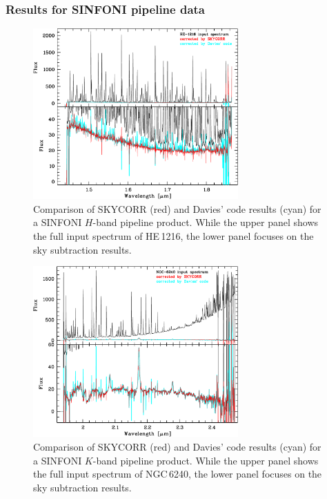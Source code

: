 \subsubsection{Results for SINFONI pipeline data}\label{sec:ressinfo}
\begin{figure}
\centering
\includegraphics[width=0.7\textwidth,clip=true]
{figures/scr_comp_sinfo_H_ex1.pdf}
\caption[]{Comparison of SKYCORR (red) and Davies' code results (cyan) for a
SINFONI $H$-band pipeline product. While the upper panel shows the full input
spectrum of HE\,1216, the lower panel focuses on the sky subtraction results.}
\label{fig:sinfo_H_ex1}
\end{figure}

\begin{figure}
\centering
\includegraphics[width=0.7\textwidth,clip=true]
{figures/scr_comp_sinfo_K_ex1.pdf}
\caption[]{Comparison of SKYCORR (red) and Davies' code results (cyan) for a
SINFONI $K$-band pipeline product. While the upper panel shows the full input
spectrum of NGC\,6240, the lower panel focuses on the sky subtraction results.}
\label{fig:sinfo_K_ex1}
\end{figure}


